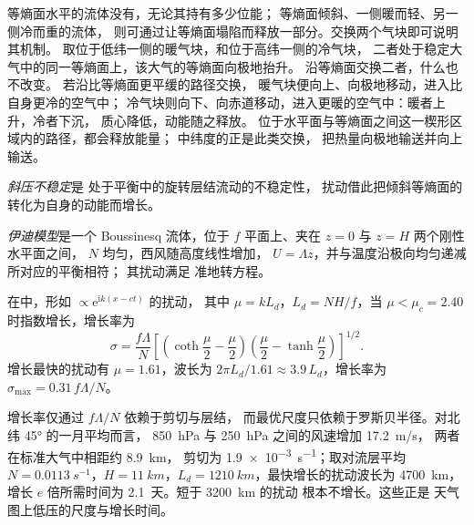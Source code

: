 等熵面水平的流体没有，无论其持有多少位能；
等熵面倾斜、一侧暖而轻、另一侧冷而重的流体，
则可通过让等熵面塌陷而释放一部分。交换两个气块即可说明其机制。
取位于低纬一侧的暖气块，和位于高纬一侧的冷气块，
二者处于稳定大气中的同一等熵面上，该大气的等熵面向极地抬升。
沿等熵面交换二者，什么也不改变。
若沿比等熵面更平缓的路径交换，
暖气块便向上、向极地移动，进入比自身更冷的空气中；
冷气块则向下、向赤道移动，进入更暖的空气中：暖者上升，冷者下沉，
质心降低，动能随之释放。
位于水平面与等熵面之间这一楔形区域内的路径，都会释放能量；
中纬度的正是此类交换，
把热量向极地输送并向上输送。

\begin{definition}[斜压不稳定]\label{def:b3:atmospheric-dynamics:baroclinic-instability}
\emph{斜压不稳定}是
处于平衡中的旋转层结流动的不稳定性，
扰动借此把倾斜等熵面的
转化为自身的动能而增长。
\end{definition}

\begin{definition}[伊迪模型]\label{def:b3:atmospheric-dynamics:eady}
\emph{伊迪模型}是一个 Boussinesq 流体，位于
$f$ 平面上、夹在 $z = 0$ 与 $z = H$ 两个刚性水平面之间，
 $N$ 均匀，西风随高度线性增加，
$U = \Lambda z$，并与温度沿极向均匀递减所对应的平衡相符；
其扰动满足
准地转方程。
\end{definition}

\begin{theorem}[伊迪增长率]\label{thm:b3:atmospheric-dynamics:eady}
在中，形如 $\propto \mathrm e^{\mathrm ik(x - ct)}$ 的扰动，
其中 $\mu = kL_d$，$L_d = NH/f$，当 $\mu < \mu_c =
2.40$ 时指数增长，增长率为
\[
\sigma = \frac{f\Lambda}{N}\left[\left(\coth\frac{\mu}{2} - \frac{\mu}{2}\right)\left(\frac{\mu}{2} - \tanh\frac{\mu}{2}\right)\right]^{1/2} .
\]
增长最快的扰动有 $\mu = 1.61$，波长为 $2\pi L_d/1.61
\approx 3.9\,L_d$，增长率为 $\sigma_{\max} = 0.31\,f\Lambda/N$。
\end{theorem}
\admitted

增长率仅通过 $f\Lambda/N$ 依赖于剪切与层结，
而最优尺度只依赖于罗斯贝半径。对北纬 \ang{45} 的一月平均而言，
\qty{850}{hPa} 与 \qty{250}{hPa} 之间的风速增加 \qty{17.2}{m/s}，
两者在标准大气中相距约 \qty{8.9}{km}，
剪切为 \qty{1.9e-3}{s^{-1}}；取对流层平均
$N = \qty{0.0113}{s^{-1}}$，$H = \qty{11}{km}$，$L_d =
\qty{1210}{km}$，最快增长的扰动波长为 \qty{4700}{km}，
增长 $e$ 倍所需时间为 \num{2.1}~天。短于 \qty{3200}{km} 的扰动
根本不增长。这些正是
天气图上低压的尺度与增长时间。

